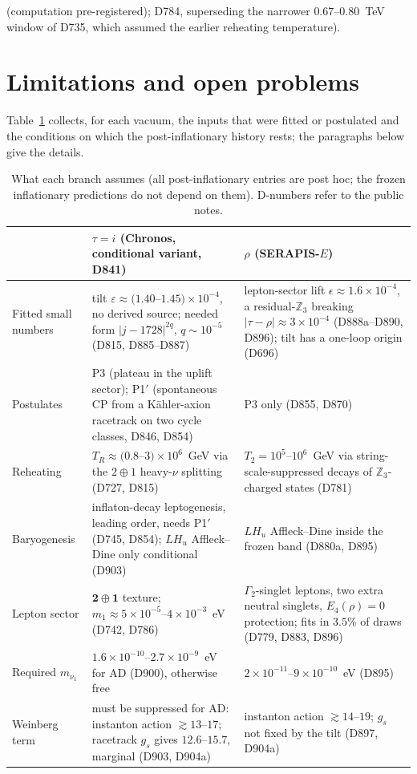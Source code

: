\documentclass[aps,prd,twocolumn,superscriptaddress,nofootinbib,floatfix]{revtex4-2}
\begin{document}
(computation pre-registered); D784, superseding the narrower $0.67$--$0.80$~TeV window of D735, which assumed the earlier reheating temperature).

\section{Limitations and open problems}\label{sec:limits}
Table~\ref{tab:conditions} collects, for each vacuum, the inputs that were fitted or postulated and the conditions on which the post-inflationary history rests; the paragraphs below give the details.
\begin{table}[tbp]
\caption{What each branch assumes (all post-inflationary entries are post hoc; the frozen inflationary predictions do not depend on them). D-numbers refer to the public notes.}\label{tab:conditions}
\footnotesize
\begin{ruledtabular}
\begin{tabular}{p{}p{}p{}}
 & $\tau=i$ (Chronos, conditional variant, D841) & $\rho$ (SERAPIS-$E$) \\ \hline
Fitted small numbers & tilt $\varepsilon\approx(1.40$--$1.45)\times10^{-4}$, no derived source; needed form $|j-1728|^{2q}$, $q\sim10^{-5}$ (D815, D885--D887) & lepton-sector lift $\epsilon\approx1.6\times10^{-4}$, a residual-$\mathbb{Z}_3$ breaking $|\tau-\rho|\approx3\times10^{-4}$ (D888a--D890, D896); tilt has a one-loop origin (D696) \\
Postulates & P3 (plateau in the uplift sector); P1$'$ (spontaneous CP from a K\"ahler-axion racetrack on two cycle classes, D846, D854) & P3 only (D855, D870) \\
Reheating & $T_R\approx(0.8$--$3)\times10^6$~GeV via the $2\oplus1$ heavy-$\nu$ splitting (D727, D815) & $T_2=10^5$--$10^6$~GeV via string-scale-suppressed decays of $\mathbb{Z}_3$-charged states (D781) \\
Baryogenesis & inflaton-decay leptogenesis, leading order, needs P1$'$ (D745, D854); $LH_u$ Affleck--Dine only conditional (D903) & $LH_u$ Affleck--Dine inside the frozen band (D880a, D895) \\
Lepton sector & $\mathbf2\oplus\mathbf1$ texture; $m_1\approx5\times10^{-5}$--$4\times10^{-3}$~eV (D742, D786) & $\Gamma_2$-singlet leptons, two extra neutral singlets, $E_4(\rho)=0$ protection; fits in $3.5\%$ of draws (D779, D883, D896) \\
Required $m_{\nu_1}$ & $1.6\times10^{-10}$--$2.7\times10^{-9}$~eV for AD (D900), otherwise free & $2\times10^{-11}$--$9\times10^{-10}$~eV (D895) \\
Weinberg term & must be suppressed for AD: instanton action $\gtrsim13$--$17$; racetrack $g_s$ gives $12.6$--$15.7$, marginal (D903, D904a) & instanton action $\gtrsim14$--$19$; $g_s$ not fixed by the tilt (D897, D904a) \\
\end{tabular}
\end{ruledtabular}
\end{table}
\end{document}
